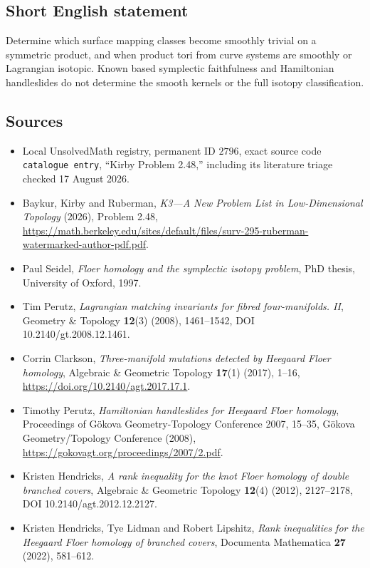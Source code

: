 \documentclass[11pt]{article}
\begin{document}
\subsection{Short English statement}
Determine which surface mapping classes become smoothly trivial on a symmetric product, and when product tori from curve systems are smoothly or Lagrangian isotopic. Known based symplectic faithfulness and Hamiltonian handleslides do not determine the smooth kernels or the full isotopy classification.
\subsection{Sources}
\begin{itemize}
\item Local UnsolvedMath registry, permanent ID $2796$, exact source code \texttt{catalogue entry}, ``Kirby Problem 2.48,'' including its literature triage checked 17 August 2026.
\item Baykur, Kirby and Ruberman, \emph{K3---A New Problem List in Low-Dimensional Topology} (2026), Problem 2.48, \url{https://math.berkeley.edu/sites/default/files/surv-295-ruberman-watermarked-author-pdf.pdf}.
\item [Sei97] Paul Seidel, \emph{Floer homology and the symplectic isotopy problem}, PhD thesis, University of Oxford, 1997.
\item [Per08a] Tim Perutz, \emph{Lagrangian matching invariants for fibred four-manifolds. II}, Geometry \& Topology \textbf{12}(3) (2008), 1461--1542, DOI 10.2140/gt.2008.12.1461.
\item [Cla17] Corrin Clarkson, \emph{Three-manifold mutations detected by Heegaard Floer homology}, Algebraic \& Geometric Topology \textbf{17}(1) (2017), 1--16, \url{https://doi.org/10.2140/agt.2017.17.1}.
\item [Per08b] Timothy Perutz, \emph{Hamiltonian handleslides for Heegaard Floer homology}, Proceedings of G\"okova Geometry-Topology Conference 2007, 15--35, G\"okova Geometry/Topology Conference (2008), \url{https://gokovagt.org/proceedings/2007/2.pdf}.
\item [Hen12] Kristen Hendricks, \emph{A rank inequality for the knot Floer homology of double branched covers}, Algebraic \& Geometric Topology \textbf{12}(4) (2012), 2127--2178, DOI 10.2140/agt.2012.12.2127.
\item [HLL22a] Kristen Hendricks, Tye Lidman and Robert Lipshitz, \emph{Rank inequalities for the Heegaard Floer homology of branched covers}, Documenta Mathematica \textbf{27} (2022), 581--612.
\end{itemize}
\end{document}
